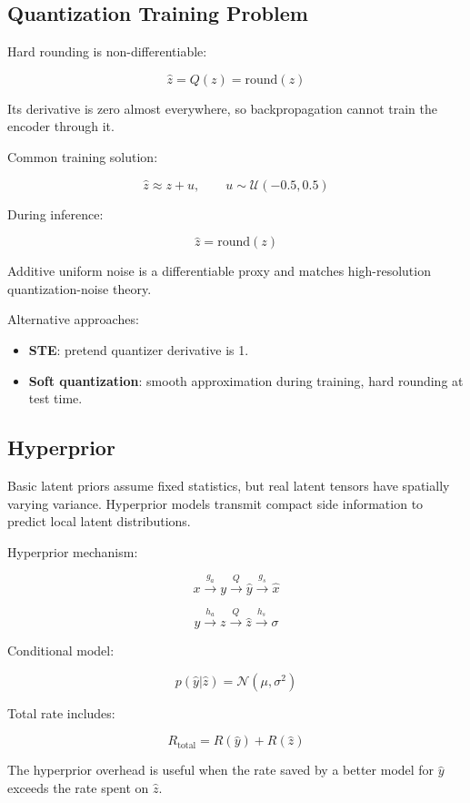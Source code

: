 \subsection{Quantization Training Problem}

Hard rounding is non-differentiable:

\[
\hat{z}=Q(z)=\mathrm{round}(z)
\]

Its derivative is zero almost everywhere, so backpropagation cannot train the encoder through it.

Common training solution:

\[
\hat{z}\approx z+u,
\qquad
u\sim\mathcal{U}(-0.5,0.5)
\]

During inference:

\[
\hat{z}=\mathrm{round}(z)
\]

Additive uniform noise is a differentiable proxy and matches high-resolution quantization-noise theory.

Alternative approaches:

\begin{itemize}
  \item \textbf{STE}: pretend quantizer derivative is 1.
  \item \textbf{Soft quantization}: smooth approximation during training, hard rounding at test time.
\end{itemize}

\subsection{Hyperprior}

Basic latent priors assume fixed statistics, but real latent tensors have spatially varying variance. Hyperprior models transmit compact side information to predict local latent distributions.

Hyperprior mechanism:

\[
x\xrightarrow{g_a}y\xrightarrow{Q}\hat{y}\xrightarrow{g_s}\hat{x}
\]

\[
y\xrightarrow{h_a}z\xrightarrow{Q}\hat{z}\xrightarrow{h_s}\sigma
\]

Conditional model:

\[
p(\hat{y}|\hat{z})=\mathcal{N}(\mu,\sigma^2)
\]

Total rate includes:

\[
R_{\text{total}}=R(\hat{y})+R(\hat{z})
\]

The hyperprior overhead is useful when the rate saved by a better model for $\hat{y}$ exceeds the rate spent on $\hat{z}$.

